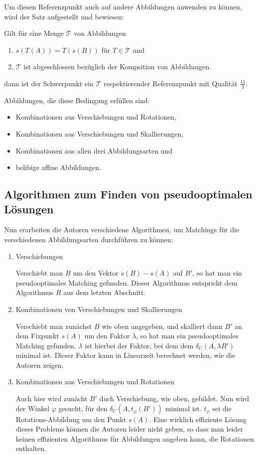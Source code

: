 Um diesen Referenzpunkt auch auf andere Abbildungen anwenden zu können, wird der Satz aufgestellt und bewiesen:

Gilt für eine Menge $\mathcal{T}$  von Abbildungen 
\begin{enumerate}
\item $s(T(A))=T(s(B))$ für $T\in\mathcal{T}$ und 
\item $\mathcal{T}$ ist abgeschlossen bezüglich der Kompsition von Abbildungen.
\end{enumerate}
dann ist der Schwerpunkt ein $\mathcal{T}$ respektierender Referenzpunkt mit Qualität $\frac{11}{3}$.

Abbildungen, die diese Bedingung erfüllen sind: 
\begin{itemize}
\item Kombinationen aus Verschiebungen und Rotationen,
\item Kombinationen aus Verschiebungen und Skallierungen,
\item Kombinationen aus allen drei Abbildungsarten und
\item belibige affine Abbildungen.
\end{itemize}

\subsection{Algorithmen zum Finden von pseudooptimalen Lösungen}

Nun erarbeiten die Autoren verschiedene Algorithmen, um Matchings für die verschiedenen Abbildungsarten durchführen zu können:
\begin{enumerate}
\item Verschiebungen

Verschiebt man $B$ um den Vektor $s(B)-s(A)$ auf $B'$, so hat man ein pseudooptimales Matching gefunden. Dieser Algorithmus entspricht dem Algorithmus $R$ aus dem letzten Abschnitt.

\item Kombinationen von Verschiebungen und Skallierungen

Verschiebt man zunächst $B$ wie oben angegeben, und skalliert dann $B'$ an dem Fixpunkt $s(A)$ um den Faktor $\lambda$, so hat man ein pseudooptimales Matching gefunden. $\lambda$ ist hierbei der Faktor, bei dem dem $\delta_C(A,\lambda B')$ minimal ist. Dieser Faktor kann in Linearzeit berechnet werden, wie die Autoren zeigen.

\item Kombinationen aus Verschiebungen und Rotationen

Auch hier wird zunächt $B'$ duch Verschiebung, wie oben, gebildet. Nun wird der Winkel $\varphi$ gesucht, für den $\delta_C(A,t_\varphi( B'))$ minimal ist. $t_\varphi$ sei die Rotations-Abbildung um den Punkt $s(A)$. Eine wirklich effiziente Lösung dieses Problems können die Autoren leider nicht geben, so dass man leider keinen effizienten Algorithmus für Abbildungen angeben kann, die Rotationen enthalten. 
\end{enumerate}

